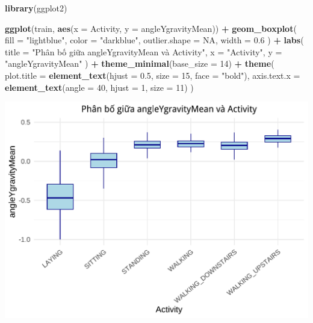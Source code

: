 \documentclass[
]{article}
\newenvironment{Shaded}{\begin{snugshade}}{\end{snugshade}}
\newcommand{\AttributeTok}[1]{\textcolor[rgb]{0.13,0.29,0.53}{#1}}
\newcommand{\ConstantTok}[1]{\textcolor[rgb]{0.56,0.35,0.01}{#1}}
\newcommand{\DecValTok}[1]{\textcolor[rgb]{0.00,0.00,0.81}{#1}}
\newcommand{\FloatTok}[1]{\textcolor[rgb]{0.00,0.00,0.81}{#1}}
\newcommand{\FunctionTok}[1]{\textcolor[rgb]{0.13,0.29,0.53}{\textbf{#1}}}
\newcommand{\NormalTok}[1]{#1}
\newcommand{\SpecialCharTok}[1]{\textcolor[rgb]{0.81,0.36,0.00}{\textbf{#1}}}
\newcommand{\StringTok}[1]{\textcolor[rgb]{0.31,0.60,0.02}{#1}}
\begin{document}
\begin{Shaded}
\begin{Highlighting}[]
\FunctionTok{library}\NormalTok{(ggplot2)}

\FunctionTok{ggplot}\NormalTok{(train, }\FunctionTok{aes}\NormalTok{(}\AttributeTok{x =}\NormalTok{ Activity, }\AttributeTok{y =}\NormalTok{ angleYgravityMean)) }\SpecialCharTok{+}
  \FunctionTok{geom\_boxplot}\NormalTok{(}
    \AttributeTok{fill =} \StringTok{"lightblue"}\NormalTok{,}
    \AttributeTok{color =} \StringTok{"darkblue"}\NormalTok{,}
    \AttributeTok{outlier.shape =} \ConstantTok{NA}\NormalTok{,}
    \AttributeTok{width =} \FloatTok{0.6}
\NormalTok{  ) }\SpecialCharTok{+}
  \FunctionTok{labs}\NormalTok{(}
    \AttributeTok{title =} \StringTok{"Phân bố giữa angleYgravityMean và Activity"}\NormalTok{,}
    \AttributeTok{x =} \StringTok{"Activity"}\NormalTok{,}
    \AttributeTok{y =} \StringTok{"angleYgravityMean"}
\NormalTok{  ) }\SpecialCharTok{+}
  \FunctionTok{theme\_minimal}\NormalTok{(}\AttributeTok{base\_size =} \DecValTok{14}\NormalTok{) }\SpecialCharTok{+}
  \FunctionTok{theme}\NormalTok{(}
    \AttributeTok{plot.title =} \FunctionTok{element\_text}\NormalTok{(}\AttributeTok{hjust =} \FloatTok{0.5}\NormalTok{, }\AttributeTok{size =} \DecValTok{15}\NormalTok{, }\AttributeTok{face =} \StringTok{"bold"}\NormalTok{),}
    \AttributeTok{axis.text.x =} \FunctionTok{element\_text}\NormalTok{(}\AttributeTok{angle =} \DecValTok{40}\NormalTok{, }\AttributeTok{hjust =} \DecValTok{1}\NormalTok{, }\AttributeTok{size =} \DecValTok{11}\NormalTok{)}
\NormalTok{  )}
\end{Highlighting}
\end{Shaded}

\includegraphics{report_files/figure-latex/unnamed-chunk-18-1.pdf}
\end{document}
